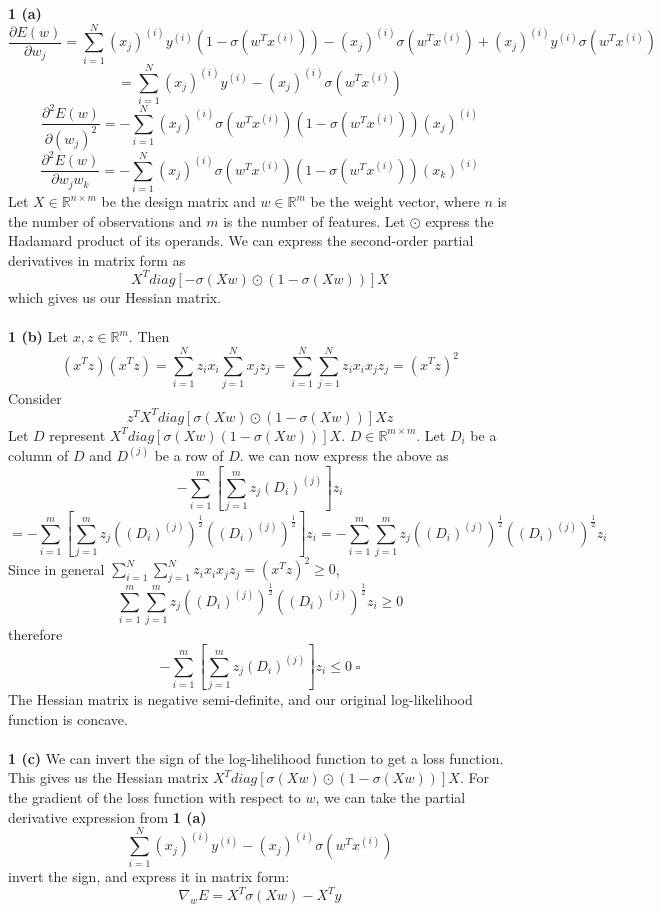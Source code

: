 \documentclass[12 pt]{article}        	%
\begin{document}
\textbf{1 (a)} 
\[
  \frac{\partial{E(w)}}{\partial w_j} = 
  \sum_{i=1}^{N} (x_j)^{(i)} y^{(i)} (1 - \sigma(w^T x^{(i)}))
  - (x_j)^{(i)} \sigma(w^T x^{(i)}) 
  + (x_j)^{(i)} y^{(i)} \sigma(w^T x^{(i)})
\]
\[
  = \sum_{i=1}^{N} (x_j)^{(i)} y^{(i)} 
  - (x_j)^{(i)} \sigma(w^T x^{(i)}) 
\]
\[
  \frac{\partial^2 E(w)}{\partial (w_j)^2}
  = - \sum_{i=1}^{N} (x_j)^{(i)} \sigma(w^T x^{(i)}) (1 - \sigma(w^T x^{(i)})) (x_j)^{(i)}
\]
\[
  \frac{\partial^2 E(w)}{\partial w_j w_k}
  = - \sum_{i=1}^{N} (x_j)^{(i)} \sigma(w^T x^{(i)}) (1 - \sigma(w^T x^{(i)})) (x_k)^{(i)}
\]
Let $ X \in \mathbb{R}^{n \times m} $ be the design matrix 
and $ w \in \mathbb{R}^m $ be the weight vector, 
where $ n $ is the number of observations
and $ m $ is the number of features. 
Let $ \odot $ express the Hadamard product of its operands. 
We can express the second-order partial derivatives in matrix form as 
\[
  X^T diag[ - \sigma(Xw) \odot (1 - \sigma(Xw)) ] X
\]
which gives us our Hessian matrix. \\ \\

\textbf{1 (b)} Let $ x, z \in \mathbb{R}^m $. Then
\[
  (x^T z)(x^T z) = 
  \sum_{i = 1}^{N} z_i x_i \sum_{j=1}^{N}x_j z_j
  = \sum_{i = 1}^{N} \sum_{j=1}^{N} z_i x_i x_j z_j
  = (x^T z)^2
\]
Consider
\[
  z^T X^T diag[ \sigma(Xw) \odot (1 - \sigma(Xw)) ] X z
\]
Let $ D $ represent $ X^T diag[ \sigma(Xw) (1 - \sigma(Xw)) ] X $. $ D \in \mathbb{R}^{ m \times m }$. 
Let $ D_i $ be a column of $ D $ and $ D^{(j)} $ be a row of $ D $.
we can now express the above as 
\[
  - \sum_{i=1}^{m} [ \sum_{j=1}^{m} z_j (D_i)^{(j)} ] z_i
\]
\[
  = - \sum_{i=1}^{m} [ \sum_{j=1}^{m} z_j ((D_i)^{(j)})^{\frac{1}{2}} ((D_i)^{(j)})^{\frac{1}{2}} ] z_i
  = - \sum_{i=1}^{m} \sum_{j=1}^{m} z_j ((D_i)^{(j)})^{\frac{1}{2}} ((D_i)^{(j)})^{\frac{1}{2}} z_i
\]
Since in general $ \sum_{i = 1}^{N} \sum_{j=1}^{N} z_i x_i x_j z_j  = (x^T z)^2 \ge 0 $, 
\[
  \sum_{i=1}^{m} \sum_{j=1}^{m} z_j ((D_i)^{(j)})^{\frac{1}{2}} ((D_i)^{(j)})^{\frac{1}{2}} z_i \ge 0
\]
therefore 
\[
  - \sum_{i=1}^{m} [ \sum_{j=1}^{m} z_j (D_i)^{(j)} ] z_i \le 0 \; \square
\]
The Hessian matrix is negative semi-definite, and our original log-likelihood function is concave. \\ \\

\textbf{1 (c)} We can invert the sign of the log-lihelihood function to get a loss function. This gives us the Hessian matrix 
$ X^T diag[ \sigma(Xw) \odot (1 - \sigma(Xw)) ] X $. For the gradient of the loss function with respect to $ w $, 
we can take the partial derivative expression from \textbf{1 (a)}
\[
  \sum_{i=1}^{N} (x_j)^{(i)} y^{(i)} 
  - (x_j)^{(i)} \sigma(w^T x^{(i)})
\]
invert the sign, and express it in matrix form:
\[
  \nabla_w E = X^T \sigma(Xw) - X^T y
\]
\end{document}
